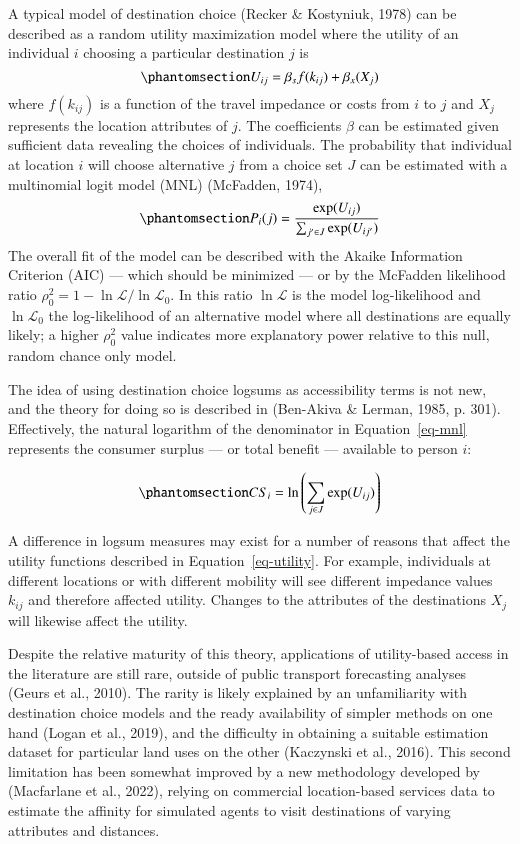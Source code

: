 \documentclass[
  letterpaper,
  number,
  review,
  3p]{elsarticle}
\begin{document}
A typical model of destination choice (Recker \& Kostyniuk, 1978) can be
described as a random utility maximization model where the utility of an
individual \(i\) choosing a particular destination \(j\) is
\begin{equation}\phantomsection\label{eq-utility}{ U_{ij} = \beta_{s}f(k_{ij}) + \beta_{x}(X_j) }\end{equation}
where \(f(k_{ij})\) is a function of the travel impedance or costs from
\(i\) to \(j\) and \(X_{j}\) represents the location attributes of
\(j\). The coefficients \(\beta\) can be estimated given sufficient data
revealing the choices of individuals. The probability that individual at
location \(i\) will choose alternative \(j\) from a choice set \(J\) can
be estimated with a multinomial logit model (MNL) (McFadden, 1974),
\begin{equation}\phantomsection\label{eq-mnl}{ P_i(j) = \frac{\exp(U_{ij})}{\sum_{j' \in J}{\exp(U_{ij'})}}}\end{equation}
The overall fit of the model can be described with the Akaike
Information Criterion (AIC) --- which should be minimized --- or by the
McFadden likelihood ratio
\(\rho^2_0 = 1 - \ln\mathcal{L} / \ln\mathcal{L}_0\). In this ratio
\(\ln{\mathcal{L}}\) is the model log-likelihood and
\(\ln{\mathcal{L}_0}\) the log-likelihood of an alternative model where
all destinations are equally likely; a higher \(\rho^2_0\) value
indicates more explanatory power relative to this null, random chance
only model.

The idea of using destination choice logsums as accessibility terms is
not new, and the theory for doing so is described in (Ben-Akiva \&
Lerman, 1985, p. 301). Effectively, the natural logarithm of the
denominator in Equation~\ref{eq-mnl} represents the consumer surplus ---
or total benefit --- available to person \(i\):

\begin{equation}\phantomsection\label{eq-cs}{ CS_i = \ln\left(\sum_{j \in J} \exp(U_{ij})\right)}\end{equation}

A difference in logsum measures may exist for a number of reasons that
affect the utility functions described in Equation~\ref{eq-utility}. For
example, individuals at different locations or with different mobility
will see different impedance values \(k_{ij}\) and therefore affected
utility. Changes to the attributes of the destinations \(X_j\) will
likewise affect the utility.

Despite the relative maturity of this theory, applications of
utility-based access in the literature are still rare, outside of public
transport forecasting analyses (Geurs et al., 2010). The rarity is
likely explained by an unfamiliarity with destination choice models and
the ready availability of simpler methods on one hand (Logan et al.,
2019), and the difficulty in obtaining a suitable estimation dataset for
particular land uses on the other (Kaczynski et al., 2016). This second
limitation has been somewhat improved by a new methodology developed by
(Macfarlane et al., 2022), relying on commercial location-based services
data to estimate the affinity for simulated agents to visit destinations
of varying attributes and distances.
\end{document}
